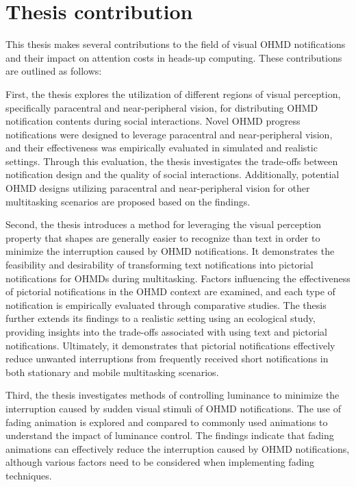 \section{Thesis contribution}
\label{sec:Intro:thesis_contribution}

This thesis makes several contributions to the field of visual OHMD notifications and their impact on attention costs in heads-up computing. These contributions are outlined as follows:

First, the thesis explores the utilization of different regions of visual perception, specifically paracentral and near-peripheral vision, for distributing OHMD notification contents during social interactions. Novel OHMD progress notifications were designed to leverage paracentral and near-peripheral vision, and their effectiveness was empirically evaluated in simulated and realistic settings. Through this evaluation, the thesis investigates the trade-offs between notification design and the quality of social interactions. Additionally, potential OHMD designs utilizing paracentral and near-peripheral vision for other multitasking scenarios are proposed based on the findings.

Second, the thesis introduces a method for leveraging the visual perception property that shapes are generally easier to recognize than text in order to minimize the interruption caused by OHMD notifications. It demonstrates the feasibility and desirability of transforming text notifications into pictorial notifications for OHMDs during multitasking. Factors influencing the effectiveness of pictorial notifications in the OHMD context are examined, and each type of notification is empirically evaluated through comparative studies. The thesis further extends its findings to a realistic setting using an ecological study, providing insights into the trade-offs associated with using text and pictorial notifications. Ultimately, it demonstrates that pictorial notifications effectively reduce unwanted interruptions from frequently received short notifications in both stationary and mobile multitasking scenarios.


Third, the thesis investigates methods of controlling luminance to minimize the interruption caused by sudden visual stimuli of OHMD notifications. The use of fading animation is explored and compared to commonly used animations to understand the impact of luminance control. The findings indicate that fading animations can effectively reduce the interruption caused by OHMD notifications, although various factors need to be considered when implementing fading techniques.


